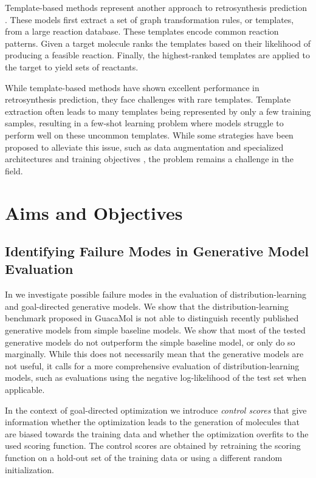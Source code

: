 Template-based methods represent another approach to retrosynthesis prediction
\citep{seglerNeuralSymbolicMachineLearning2017,seglerPlanningChemicalSyntheses2018,daiRetrosynthesisPredictionConditional2020,sunEnergybasedViewRetrosynthesis2020}.
These models first extract a set of graph transformation rules, or templates, from a large reaction
database. These templates encode common reaction patterns. Given a target molecule ranks the
templates based on their likelihood of producing a feasible reaction. Finally, the highest-ranked
templates are applied to the target to yield sets of reactants.

While template-based methods have shown excellent performance in retrosynthesis prediction, they
face challenges with rare templates. Template extraction often leads to many templates being
represented by only a few training samples, resulting in a few-shot learning problem where models
struggle to perform well on these uncommon templates. While some strategies have been proposed
to alleviate this issue, such as data augmentation \citep{fortunatoDataAugmentationPretraining2020}
and specialized architectures and training objectives
\citep{daiRetrosynthesisPredictionConditional2020}, the problem remains a challenge in the field.

\section{Aims and Objectives\label{sec:aims-objectives}}
\subsection{Identifying Failure Modes in Generative Model Evaluation}
In \citep{renzFailureModesMolecule2019} we investigate possible failure modes in the evaluation of
distribution-learning and goal-directed generative models. We show that the distribution-learning
benchmark proposed in GuacaMol \citep{brownGuacaMolBenchmarkingModels2019} is not able to
distinguish recently published generative models from simple baseline models. We show that most of
the tested generative models do not outperform the simple baseline model, or only do so marginally.
While this does not necessarily mean that the generative models are not useful, it calls for a more
comprehensive evaluation of distribution-learning models, such as evaluations using the negative
log-likelihood of the test set when applicable.

In the context of goal-directed optimization we introduce \emph{control scores} that give
information whether the optimization leads to the generation of molecules that are biased towards the
training data and whether the optimization overfits to the used scoring function.
The control scores are obtained by retraining the scoring function on a hold-out set of the training
data or using a different random initialization.

